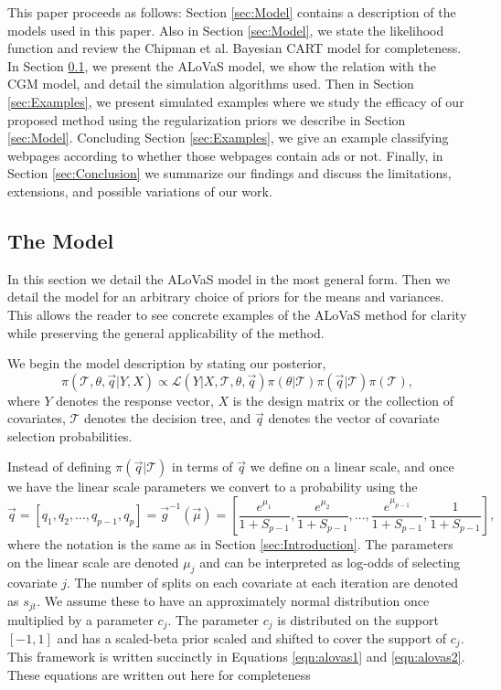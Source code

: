 This paper proceeds as follows: Section \ref{sec:Model} contains a description of the models used in this paper. Also in Section \ref{sec:Model}, we state the likelihood function and review the Chipman et al. Bayesian CART \cite{chipman1998bayesian} model for completeness.  In Section \ref{sec:ALoVaS_model}, we present the ALoVaS model, we show the relation with the CGM model, and detail the simulation algorithms used. Then in Section \ref{sec:Examples}, we present simulated examples where we study the efficacy of our proposed method using the regularization priors we describe in Section \ref{sec:Model}. Concluding Section \ref{sec:Examples}, we give an example classifying webpages according to whether those webpages contain ads or not. Finally, in Section \ref{sec:Conclusion} we summarize our findings and discuss the limitations, extensions, and possible variations of our work.      

\subsection{The Model}\label{sec:ALoVaS_model}

In this section we detail the ALoVaS model in the most general form. Then we detail the model for an arbitrary choice of priors for the means and variances. This allows the reader to see concrete examples of the ALoVaS method for clarity while preserving the general applicability of the method. 

We begin the model description by stating our posterior, 
\begin{equation}\label{eqn:post}
\pi(\mathcal{T}, \theta, \vec{q} \vert Y,X) \propto \mathcal{L}(Y \vert X, \mathcal{T}, \theta, \vec{q})\pi(\theta \vert \mathcal{T})\pi(\vec{q}\vert \mathcal{T})\pi(\mathcal{T}), 
\end{equation}
where $Y$ denotes the response vector, $X$ is the design matrix or the collection of covariates, $\mathcal{T}$ denotes the decision tree, and $\vec{q}$ denotes the vector of covariate selection probabilities. 

Instead of defining $\pi(\vec{q} \vert \mathcal{T})$ in terms of $\vec{q}$ we define on a linear scale, and once we have the linear scale parameters we convert to a probability using the \ALT
\begin{equation}\label{eqn:alt}
\vec{q} = \left[ q_1, q_2,\dots, q_{p-1}, q_p \right] =\vec{g}^{-1}(\vec{\mu})= \left[ \frac{e^{\mu_1}}{1+S_{p-1}},\frac{e^{\mu_2}}{1+S_{p-1}}, \dots,\frac{e^{\mu_{p-1}}}{1+S_{p-1}},\frac{1}{1+S_{p-1}} \right],
\end{equation} 
where the notation is the same as in Section \ref{sec:Introduction}. The parameters on the linear scale are denoted $\mu_j$ and can be interpreted as log-odds of selecting covariate $j$. The number of splits on each covariate at each iteration are denoted as $s_{jt}$. We assume these to have an approximately normal distribution once multiplied by a parameter $c_j$. The parameter $c_j$ is distributed on the support $[-1,1]$ and has a scaled-beta prior scaled and shifted to cover the support of $c_j$. This framework is written succinctly in Equations \ref{eqn:alovas1} and \ref{eqn:alovas2}. These equations are written out here for completeness

